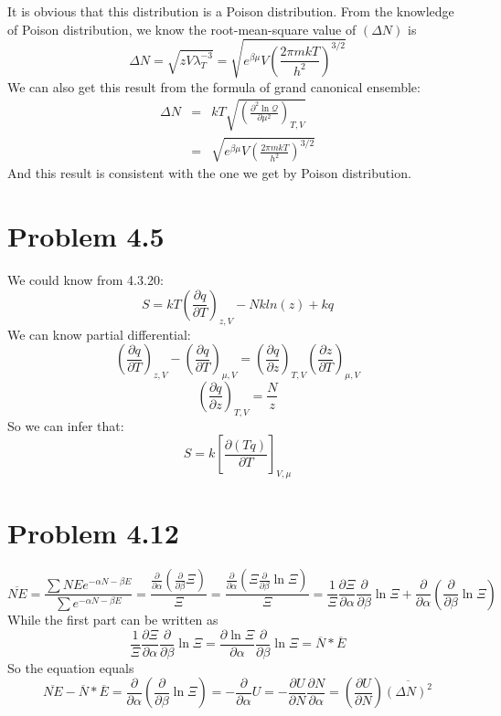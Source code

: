 \documentclass{article}
\begin{document}
It is obvious that this distribution is a Poison distribution. From the knowledge of Poison distribution, we know the root-mean-square value of $(\Delta N)$ is
\begin{equation}
\Delta N = \sqrt{zV\lambda_T^{-3}}=\sqrt{e^{\beta\mu}V\left(\frac{2\pi mkT}{h^2}\right)^{3/2}}
\end{equation}
We can also get this result from the formula of grand canonical ensemble:
\begin{eqnarray}
\Delta N &=&kT\sqrt{ \left(\frac{\partial^2 \ln\mathcal{Q}}{\partial\mu^2}\right)_{T,V}}\nonumber\\
&=&\sqrt{e^{\beta\mu}V\left(\frac{2\pi mkT}{h^2}\right)^{3/2}}
\end{eqnarray}
And this result is consistent with the one we get by Poison distribution.

\section*{Problem 4.5} %
\label{sec:problem_4_5}
	
	We could know from 4.3.20:
	$$S=kT(\frac{\partial q}{\partial T})_{z,V}-Nkln(z)+kq$$
	We can know partial differential:
	$$(\frac{\partial q}{\partial T})_{z,V}-(\frac{\partial q}{\partial T})_{\mu,V}=(\frac{\partial q}{\partial z})_{T,V}(\frac{\partial z}{\partial T})_{\mu,V}$$
	$$(\frac{\partial q}{\partial z})_{T,V}=\frac{N}{z}$$
	So we can infer that:
	$$S=k[\frac{\partial (Tq)}{\partial{T}}]_{V,\mu}$$


\section*{Problem 4.12}
\begin{equation}
	\overline{NE}=\frac{\sum NE e^{- \alpha N- \beta E}}{\sum e^{-\alpha N-\beta E}}=\frac{\frac{\partial}{\partial \alpha}(\frac{\partial}{\partial \beta}\Xi)}{\Xi}=\frac{\frac{\partial}{\partial \alpha}(\Xi \frac{\partial}{\partial \beta}\ln \Xi)}{\Xi}=\frac{1}{\Xi} \frac{\partial \Xi}{\partial \alpha}\frac{\partial}{\partial \beta}\ln \Xi +\frac{\partial}{\partial \alpha}(\frac{\partial}{\partial \beta}\ln \Xi)
\end{equation}
	While the first part can be written as
\begin{equation}
	\frac{1}{\Xi} \frac{\partial \Xi}{\partial \alpha}\frac{\partial}{\partial \beta}\ln \Xi= \frac{\partial \ln \Xi}{\partial \alpha}\frac{\partial}{\partial \beta}\ln \Xi=\overline{N}* \overline{E}
\end{equation}
	So the equation equals
\begin{equation}
	\overline{NE}-\overline{N}* \overline{E}=\frac{\partial}{\partial \alpha}(\frac{\partial}{\partial \beta}\ln \Xi)=-\frac{\partial}{\partial \alpha} U=-\frac{\partial U}{\partial N}\frac{\partial N}{\partial \alpha}= (\frac{\partial U}{\partial N})\overline{(\Delta N)^2}
\end{equation}
\end{document}
